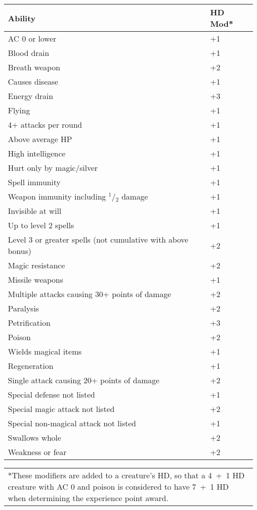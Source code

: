 \begin{multicols}{2}
\begin{minipage}{\columnwidth}
\label{hdvaluemods}
\noindent
\begin{tabular}{|p{}|p{}|}
\hline
Ability			& HD Mod* \\
\hline\hline
\rowcolor[gray]{.9}AC 0 or lower	& +1 \\
Blood drain		& +1 \\
\rowcolor[gray]{.9}Breath weapon	& +2 \\
Causes disease	& +1 \\
\rowcolor[gray]{.9}Energy drain	& +3 \\
Flying			& +1 \\
\rowcolor[gray]{.9}4+ attacks per round	& +1 \\
Above average HP		& +1 \\
\rowcolor[gray]{.9}High intelligence		& +1 \\
Hurt only by magic/silver	& +1 \\
\rowcolor[gray]{.9}Spell immunity			& +1 \\
Weapon immunity including $^1$/$_2$ damage	& +1 \\
\rowcolor[gray]{.9}Invisible at will		& +1 \\
Up to level 2 spells	& +1 \\
\rowcolor[gray]{.9}Level 3 or greater spells (not cumulative with above bonus)		& +2 \\
Magic resistance		& +2 \\
\rowcolor[gray]{.9}Missile weapons			& +1 \\
Multiple attacks causing 30+ points of damage	& +2 \\
\rowcolor[gray]{.9}Paralysis				& +2 \\
Petrification			& +3 \\
\rowcolor[gray]{.9}Poison					& +2 \\
Wields magical items	& +1 \\
\rowcolor[gray]{.9}Regeneration			& +1 \\
Single attack causing 20+ points of damage	& +2 \\
\rowcolor[gray]{.9}Special defense not listed					& +1 \\
Special magic attack not listed				& +2 \\
\rowcolor[gray]{.9}Special non-magical attack not listed	& +1 \\
Swallows whole							& +2 \\
\rowcolor[gray]{.9}Weakness or fear						& +2 \\
\hline
\end{tabular}
\noindent\begin{tabular}{p{}}
*These modifiers are added to a creature's HD, so that a 4~+~1 HD creature with AC 0 and poison is considered to have 7~+~1 HD when determining the experience point award. \\
\end{tabular}\vspace{.5em}

\end{minipage}

\end{multicols}

\pagebreak \thispagestyle{empty} \label{throughtheglass}
